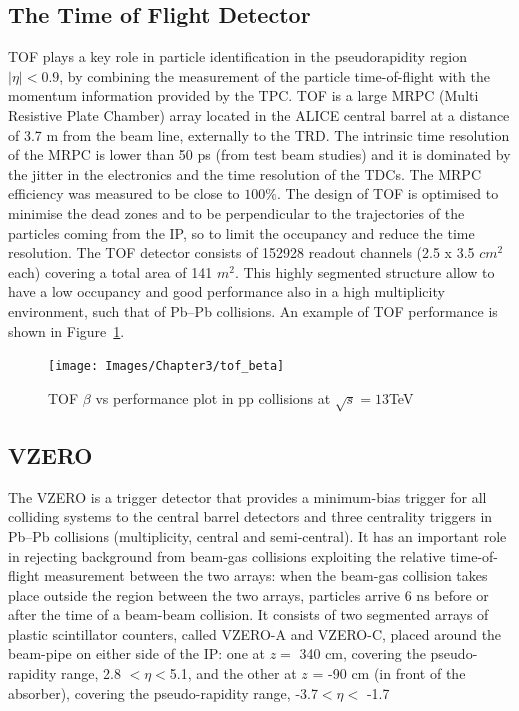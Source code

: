 \subsection{The Time of Flight Detector}
\label{par:3.2c}
TOF plays a key role in particle identification in the pseudorapidity region $|\eta| < 0.9$, by combining the measurement of the particle time-of-flight with the momentum information provided by the TPC. TOF is a large MRPC (Multi Resistive Plate Chamber) array located in the ALICE central barrel at a distance of 3.7 m from the beam line, externally to the TRD. The intrinsic time resolution of the MRPC is lower than 50 ps (from test beam studies) and it is dominated by the jitter in the electronics and the time resolution of the TDCs. The MRPC efficiency was measured to be close to $100\%$.  The design of TOF is optimised to minimise the dead zones and to be perpendicular to the trajectories of the particles coming from the IP, so to limit the occupancy and reduce the time resolution. The TOF detector consists of 152928 readout channels (2.5 x 3.5 $cm^2$ each) covering a total area of 141 $m^2$. This highly segmented structure allow to have a low occupancy and good performance also in a high multiplicity environment, such that of Pb–Pb collisions. An example of TOF performance is shown in \mbox{Figure \ref{Fig:cap3-1.8}}.

\begin{figure}[t]
\centering
\texttt{[image: Images/Chapter3/tof\_beta]}
\caption[TOF $\beta$ vs \pT performance plot in pp collisions at $\sqrt{s} = 13$TeV]{TOF $\beta$ vs \pT performance plot in pp collisions at $\sqrt{s} = 13$TeV}
\label{Fig:cap3-1.8}
\end{figure}

\subsection{VZERO}
\label{par:3.2c}
The VZERO is a trigger detector that provides a minimum-bias trigger for all colliding systems to the central barrel detectors and three centrality triggers in Pb–Pb collisions (multiplicity, central and semi-central). It has an important role in rejecting background from beam-gas collisions exploiting the relative time-of- flight measurement between the two arrays: when the beam-gas collision takes place outside the region between the two arrays, particles arrive 6 ns before or after the time of a beam-beam collision. It consists of two segmented arrays of plastic scintillator counters, called VZERO-A and VZERO-C, placed around the beam-pipe on either side of the IP: one at $z =$  340 cm, covering the pseudo-rapidity range, 2.8 $< \eta< $5.1, and the other at $z$ = -90 cm (in front of the absorber), covering the pseudo-rapidity range, -3.7$ < \eta <$ -1.7




